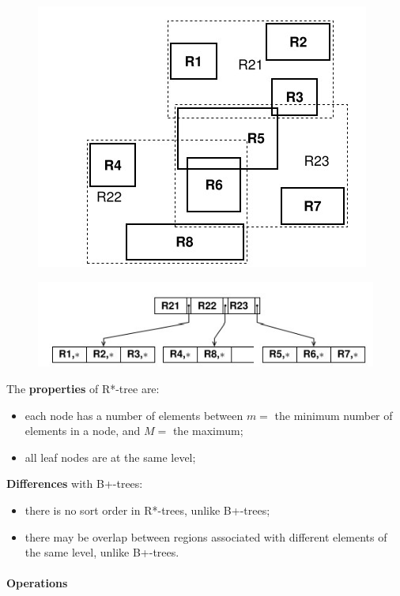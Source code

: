 \begin{figure}[H]
		\centering
		\includegraphics[scale = 1.3]{img/part7.jpg}
		\label{part6}
\end{figure}

\begin{figure}[H]
		\centering
		\includegraphics[scale = 1.5]{img/part8.jpg}
		\label{part6}
\end{figure}

The \textbf{properties} of R*-tree are:
\begin{itemize}
    \item each node has a number of elements between $m = $ the minimum number of elements in a node, and $M = $ the maximum;
    \item all leaf nodes are at the same level;
\end{itemize}

\textbf{Differences} with B+-trees:
\begin{itemize}
    \item there is no sort order in R*-trees, unlike B+-trees;
    \item there may be overlap between regions associated with different elements of the same level, unlike B+-trees.
\end{itemize}

\paragraph{Operations}

